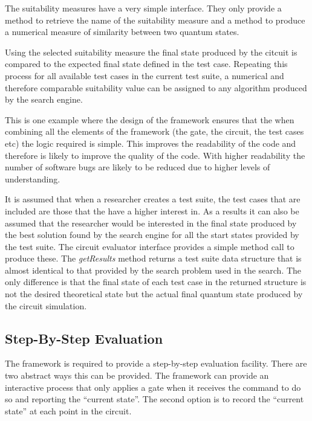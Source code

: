 The suitability measures have a very simple interface.
They only provide a method to retrieve the name of the suitability measure and a method to produce a numerical measure of similarity between two quantum states.

Using the selected suitability measure the final state produced by the citcuit is compared to the expected final state defined in the test case.
Repeating this process for all available test cases in the current test suite, a numerical and therefore comparable suitability value can be assigned to any algorithm produced by the search engine.

This is one example where the design of the framework ensures that the when combining all the elements of the framework (the gate, the circuit, the test cases etc) the logic required is simple.
This improves the readability of the code and therefore is likely to improve the quality of the code.
With higher readability the number of software bugs are likely to be reduced due to higher levels of understanding.

It is assumed that when a researcher creates a test suite, the test cases that are included are those that the have a higher interest in.
As a results it can also be assumed that the researcher would be interested in the final state produced by the best solution found by the search engine for all the start states provided by the test suite.
The circuit evaluator interface provides a simple method call to produce these.
The \emph{getResults} method returns a test suite data structure that is almost identical to that provided by the search problem used in the search.
The only difference is that the final state of each test case in the returned structure is not the desired theoretical state but the actual final quantum state produced by the circuit simulation.

\subsection{Step-By-Step Evaluation}
\label{sec:sbsecireval}
The framework is required to provide a step-by-step evaluation facility.
There are two abstract ways this can be provided.
The framework can provide an interactive process that only applies a gate when it receives the command to do so and reporting the ``current state''.
The second option is to record the ``current state'' at each point in the circuit.

